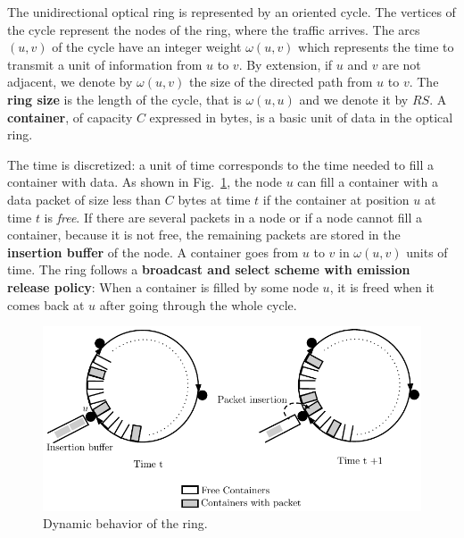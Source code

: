 \documentclass[10pt, conference, letterpaper]{IEEEtran}
\begin{document}
  The unidirectional optical ring is represented by an oriented cycle. The vertices of the cycle represent the nodes of the ring, where the traffic arrives. The arcs $(u,v)$ of the cycle have an integer weight $\omega(u,v)$ which represents the time to transmit a unit of information from $u$ to $v$. By extension, if $u$ and $v$ are not adjacent, we denote by $\omega(u,v)$ the size of the directed path from $u$ to $v$.  The \textbf{ring size} is the length of the cycle, that is $\omega(u,u)$ and we denote it by $RS$. A {\bf container}, of capacity $C$  expressed in bytes, is a basic unit of data in the optical ring. 
  
  The time is discretized: a unit of time corresponds to the time needed to fill a container with data.
  As shown in Fig.~\ref{fig:containers}, the node $u$ can fill a container with a data packet of size less than $C$ bytes at time $t$ if the container at position $u$ at time $t$ is \emph{free}. 
  If there are several packets in a node or if a node cannot fill a container, because it is not free, 
  the remaining packets are stored in the {\bf insertion buffer} of the node. 
  A container goes from $u$ to $v$ in $\omega(u,v)$ units of time. The ring follows a {\bf broadcast and select scheme with emission release policy}: When a container is filled by some node $u$, it is freed when it comes back at $u$ after going through the whole cycle.
   
  
  \begin{figure}[h!]

        \begin{center}
      \hspace{-2.3cm}\includegraphics[scale=0.65]{containers}
   
   
      \end{center} 

   
     \caption{Dynamic behavior of the ring.}\label{fig:containers}

  \end{figure}
  
\end{document}
